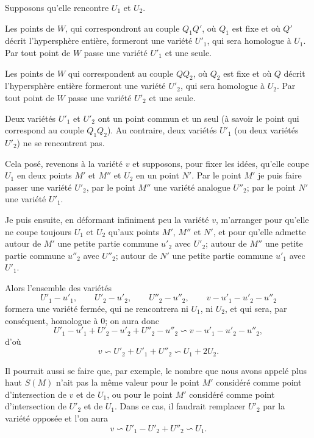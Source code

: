 \documentclass{article}
\begin{document}
Supposons qu'elle rencontre $U_{1}$ et $U_{2}$.

Les points de $W$, qui correspondront au couple $Q_{1}Q'$, où $Q_{1}$ est fixe et où $Q'$ décrit l'hypersphère entière, formeront une variété $U'_{1}$, qui sera homologue à $U_{1}$. Par tout point de $W$ passe une variété $U'_{1}$ et une seule.

Les points de $W$ qui correspondent au couple $QQ_{2}$, où $Q_{2}$ est fixe et où $Q$ décrit l'hypersphère entière formeront une variété $U'_{2}$, qui sera homologue à $U_{2}$. Par tout point de $W$ passe une variété $U'_{2}$ et une seule.

Deux variétés $U'_{1}$ et $U'_{2}$ ont un point commun et un seul (à savoir le point qui correspond au couple $Q_{1}Q_{2}$). Au contraire, deux variétés $U'_{1}$ (ou deux variétés $U'_{2}$) ne se rencontrent pas.

Cela posé, revenons à la variété $v$ et supposons, pour fixer les idées, qu'elle coupe $U_{1}$ en deux points $M'$ et $M''$ et $U_{2}$ en un point $N'$. Par le point $M'$ je puis faire passer une variété $U'_{2}$, par le point $M''$ une variété analogue $U''_{2}$; par le point $N'$ une variété $U'_{1}$.

Je puis ensuite, en déformant infiniment peu la variété $v$, m'arranger pour qu'elle ne coupe toujours $U_{1}$ et $U_{2}$ qu'aux points $M'$, $M''$ et $N'$, et pour qu'elle admette autour de $M'$ une petite partie commune $u'_{2}$ avec $U'_{2}$; autour de $M''$ une petite partie commune $u''_{2}$ avec $U''_{2}$; autour de $N'$ une petite partie commune $u'_{1}$ avec $U'_{1}$.

Alors l'ensemble des variétés
\[ U'_{1} - u'_{1}, \qquad U'_{2} - u'_{2}, \qquad U''_{2} - u''_{2}, \qquad v - u'_{1} - u'_{2} - u''_{2} \]
formera une variété fermée, qui ne rencontrera ni $U_{1}$, ni $U_{2}$, et qui sera, par conséquent, homologue à 0; on aura donc
\[ U'_{1} - u'_{1} + U'_{2} - u'_{2} + U''_{2} - u''_{2} \backsim v - u'_{1} - u'_{2} - u''_{2}, \]
d'où
\[ v \backsim U'_{2} + U'_{1} + U''_{2} \backsim U_{1} + 2U_{2}. \]

Il pourrait aussi se faire que, par exemple, le nombre que nous avons appelé plus haut $S(M)$ n'ait pas la même valeur pour le point $M'$ considéré comme point d'intersection de $v$ et de $U_{1}$, ou pour le point $M'$ considéré comme point d'intersection de $U'_{2}$ et de $U_{1}$. Dans ce cas, il faudrait remplacer $U'_{2}$ par la variété opposée et l'on aura
\[ v \backsim U'_{1} - U'_{2} + U''_{2} \backsim U_{1}. \]
\end{document}
